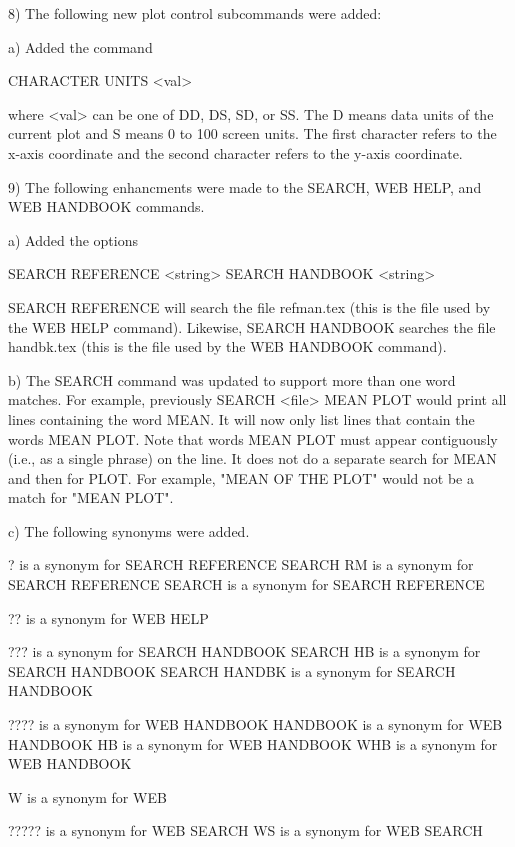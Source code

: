  8) The following new plot control subcommands were added:

    a) Added the command

         CHARACTER UNITS <val> 

       where <val> can be one of DD, DS, SD, or SS.  The D means data
       units of the current plot and S means 0 to 100 screen units.
       The first character refers to the x-axis coordinate and the
       second character refers to the y-axis coordinate.

 9) The following enhancments were made to the SEARCH, WEB HELP,
    and WEB HANDBOOK commands.

    a) Added the options

         SEARCH REFERENCE <string>
         SEARCH HANDBOOK  <string>

       SEARCH REFERENCE will search the file refman.tex (this is the
       file used by the WEB HELP command).  Likewise, SEARCH HANDBOOK
       searches the file handbk.tex (this is the file used by the
       WEB HANDBOOK command).

    b) The SEARCH command was updated to support more than one
       word matches.  For example, previously
       SEARCH <file> MEAN PLOT would print all lines containing the
       word MEAN.  It will now only list lines that contain the
       words MEAN PLOT.  Note that words MEAN PLOT must appear
       contiguously (i.e., as a single phrase) on the line.
       It does not do a separate search for MEAN and then for
       PLOT.  For example, "MEAN OF THE PLOT" would not be a
       match for "MEAN PLOT".

    c) The following synonyms were added.

          ? is a synonym for SEARCH REFERENCE
          SEARCH RM is a synonym for SEARCH REFERENCE
          SEARCH is a synonym for SEARCH REFERENCE

          ?? is a synonym for WEB HELP

          ??? is a synonym for SEARCH HANDBOOK
          SEARCH HB is a synonym for SEARCH HANDBOOK
          SEARCH HANDBK is a synonym for SEARCH HANDBOOK

          ???? is a synonym for WEB HANDBOOK
          HANDBOOK is a synonym for WEB HANDBOOK
          HB is a synonym for WEB HANDBOOK
          WHB is a synonym for WEB HANDBOOK

          W is a synonym for WEB

          ????? is a synonym for WEB SEARCH
          WS is a synonym for WEB SEARCH

